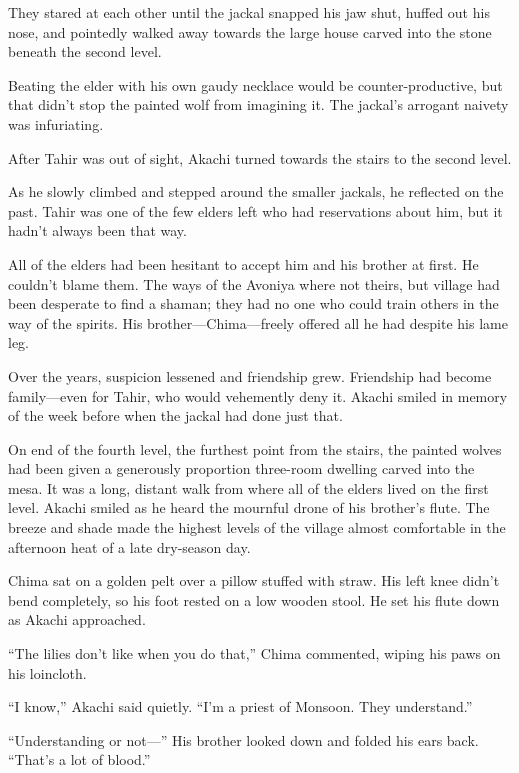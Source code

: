 They stared at each other until the jackal snapped his jaw shut, huffed out his nose, and pointedly walked away towards the large house carved into the stone beneath the second level.

Beating the elder with his own gaudy necklace would be counter-productive, but that didn't stop the painted wolf from imagining it. The jackal's arrogant naivety was infuriating.

After Tahir was out of sight, Akachi turned towards the stairs to the second level.

\secdiv

\noindent As he slowly climbed and stepped around the smaller jackals, he reflected on the past. Tahir was one of the few elders left who had reservations about him, but it hadn't always been that way.

All of the elders had been hesitant to accept him and his brother at first. He couldn't blame them. The ways of the Avoniya where not theirs, but village had been desperate to find a shaman; they had no one who could train others in the way of the spirits. His brother---Chima---freely offered all he had despite his lame leg.

Over the years, suspicion lessened and friendship grew. Friendship had become family---even for Tahir, who would vehemently deny it. Akachi smiled in memory of the week before when the jackal had done just that.

\secdiv

\noindent On end of the fourth level, the furthest point from the stairs, the painted wolves had been given a generously proportion three-room dwelling carved into the mesa. It was a long, distant walk from where all of the elders lived on the first level. Akachi smiled as he heard the mournful drone of his brother's flute. The breeze and shade made the highest levels of the village almost comfortable in the afternoon heat of a late dry-season day.

Chima sat on a golden pelt over a pillow stuffed with straw. His left knee didn't bend completely, so his foot rested on a low wooden stool. He set his flute down as Akachi approached.

``The lilies don't like when you do that,'' Chima commented, wiping his paws on his loincloth.

``I know,'' Akachi said quietly. ``I'm a priest of Monsoon. They understand.''

``Understanding or not---'' His brother looked down and folded his ears back. ``That's a lot of blood.''

